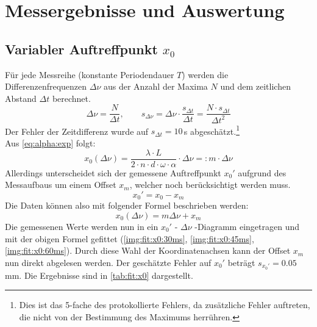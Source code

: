\section{Messergebnisse und Auswertung}
\subsection{Variabler Auftreffpunkt \texorpdfstring{$x_0$}{x0}}
Für jede Messreihe (konstante Periodendauer $T$) werden die Differenzenfrequenzen $\Delta \nu$ aus der Anzahl der Maxima $N$ und dem zeitlichen 
Abstand $\Delta t$ berechnet.
\begin{equation}
  \label{eq:delta_nu}
  \Delta \nu = \frac{N}{\Delta t}, \qquad s_{\Delta \nu} = \Delta \nu \cdot \frac{s_{\Delta t}}{\Delta t} = \frac{N \cdot s_{\Delta t}}{\Delta t^2}
\end{equation}
Der Fehler der Zeitdifferenz wurde auf $s_{\Delta t} = 10$\,\textmu s abgeschätzt.\footnote{Dies ist das 5-fache des protokollierte Fehlers, da 
zusätzliche Fehler auftreten, die nicht von der Bestimmung des Maximums herrühren.} \\
Aus \autoref{eq:alpha:exp} folgt:
\begin{equation}
  \label{eq:x0:m}
  x_0(\Delta \nu) = \frac{\lambda \cdot L}{2 \cdot n \cdot d \cdot \omega \cdot \alpha} \cdot \Delta \nu =: m \cdot \Delta \nu
\end{equation}
Allerdings unterscheidet sich der gemessene Auftreffpunkt $x_0'$ aufgrund des Messaufbaus um einem Offset $x_m$, 
welcher noch berücksichtigt werden muss.
\begin{equation}
  x_0' = x_0 - x_m
\end{equation}
Die Daten können also mit folgender Formel beschrieben werden:
\begin{equation}
  x_0(\Delta \nu) = m \Delta \nu + x_m
\end{equation}
Die gemessenen Werte werden nun in ein $x_0'$ - $\Delta \nu$ -Diagramm eingetragen und mit der obigen Formel gefittet 
(\autoref{img:fit:x0:30ms}, \autoref{img:fit:x0:45ms}, \autoref{img:fit:x0:60ms}). Durch diese Wahl der Koordinatenachsen kann der Offset $x_m$ 
nun direkt abgelesen werden.
Der geschätzte Fehler auf $x_0'$ beträgt $s_{x_0'} = 0.05$mm. Die Ergebnisse sind in \autoref{tab:fit:x0} dargestellt.


